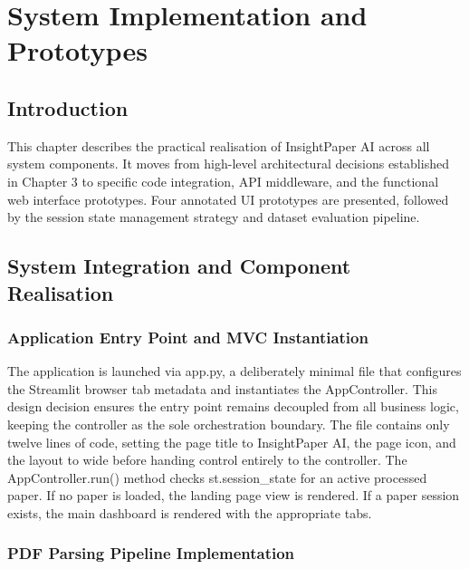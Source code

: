 \chapter{System Implementation and Prototypes}

\section{Introduction}

This chapter describes the practical realisation of InsightPaper AI across all system components. It moves from high-level architectural decisions established in Chapter 3 to specific code integration, API middleware, and the functional web interface prototypes. Four annotated UI prototypes are presented, followed by the session state management strategy and dataset evaluation pipeline.

\section{System Integration and Component Realisation}

\subsection{Application Entry Point and MVC Instantiation}

The application is launched via app.py, a deliberately minimal file that configures the Streamlit browser tab metadata and instantiates the AppController. This design decision ensures the entry point remains decoupled from all business logic, keeping the controller as the sole orchestration boundary. The file contains only twelve lines of code, setting the page title to InsightPaper AI, the page icon, and the layout to wide before handing control entirely to the controller.
\newline \newline The AppController.run() method checks st.session\_state for an active processed paper. If no paper is loaded, the landing page view is rendered. If a paper session exists, the main dashboard is rendered with the appropriate tabs.

\subsection{PDF Parsing Pipeline Implementation}

